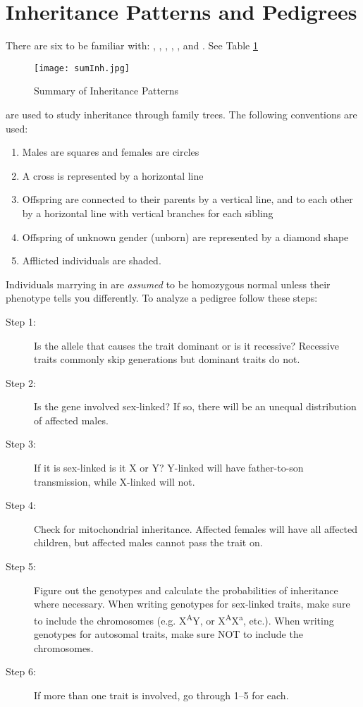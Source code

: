 \documentclass[../Bio_chemistryReview.tex]{subfiles}
\begin{document}
\section{Inheritance Patterns and Pedigrees}
There are six  to be familiar with:
, , ,
, , and . See Table
\ref{tab:inh}
\begin{figure}[H]
  \centering
  \texttt{[image: sumInh.jpg]}
  \caption{Summary of Inheritance Patterns}
  \label{tab:inh}
\end{figure}
\noindent{} are used to study inheritance through family trees. The
following conventions are used:
\begin{enumerate}
  \item Males are squares and females are circles
  \item A cross is represented by a horizontal line
  \item Offspring are connected to their parents by a vertical line, and to each
    other by a horizontal line with vertical branches for each sibling
  \item Offspring of unknown gender (unborn) are represented by a diamond shape
  \item Afflicted individuals are shaded.
\end{enumerate}
Individuals marrying in are \textit{assumed} to be homozygous normal unless their
phenotype tells you differently. To analyze a pedigree follow these steps:
\begin{description}
  \item[Step 1:] Is the allele that causes the trait dominant or is it
    recessive? Recessive traits commonly skip generations but dominant traits do
    not.
  \item[Step 2:] Is the gene involved sex-linked? If so, there will be an
    unequal distribution of affected males.
  \item[Step 3:] If it is sex-linked is it X or Y? Y-linked will have
    father-to-son transmission, while X-linked will not.
  \item[Step 4:] Check for mitochondrial inheritance. Affected females will have
    all affected children, but affected males cannot pass the trait on.
  \item[Step 5:] Figure out the genotypes and calculate the probabilities of
    inheritance where necessary. When writing genotypes for sex-linked traits,
    make sure to include the chromosomes (e.g. X\textsuperscript{A}Y, or
    X\textsuperscript{A}X\textsuperscript{a}, etc.). When writing genotypes for
    autosomal traits, make sure NOT to include the chromosomes.
  \item[Step 6:] If more than one trait is involved, go through 1--5 for each.
\end{description}
\end{document}
